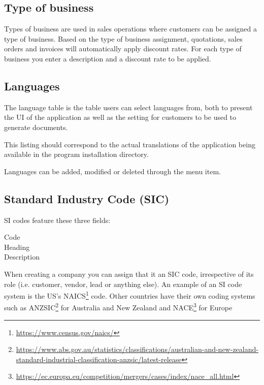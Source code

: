 \subsection{Type of business}
\label{subsec-company-config-business-types}

Types of business are used in sales operations where customers can be assigned a type
of business. Based on the type of business assignment, quotations, sales orders and
invoices will automatically apply discount rates. For each type of business you enter a description and a discount rate to be applied.

\subsection{Languages}
\label{subsec-company-config-languages}

The language table is the table users can select languages from, both to present
the UI of the application as well as the setting for customers to be used to generate
documents.

This listing should correspond to the actual translations of the application being
available in the program installation directory.

Languages can be added, modified or deleted through the  menu item.

\subsection{Standard Industry Code (SIC)}
\label{subsec-company-config-sic}

SI codes feature these three fields:

\begin{description}
\item [Code]
\item [Heading]
\item [Description]
\end{description}

When creating a company you can assign that it an SIC code, irrespective of its role (i.e. customer,
vendor, lead or anything else). An example of an SI code system is the
US's NAICS\footnote{\url{https://www.census.gov/naics/}} code.
Other countries have their own coding systems such
as ANZSIC\footnote{\url{https://www.abs.gov.au/statistics/classifications/australian-and-new-zealand-standard-industrial-classification-anzsic/latest-release}} for Australia and New Zealand
and NACE\footnote{\url{https://ec.europa.eu/competition/mergers/cases/index/nace\_all.html}} for Europe

